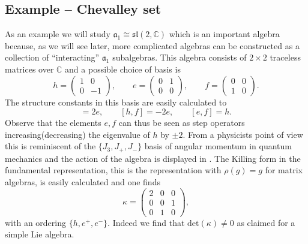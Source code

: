 \subsection{Example -- Chevalley set}
As an example we will study $\mathfrak{a}_1\cong\mathfrak{sl}(2,\mathbb{C})$ which is an important algebra because, as we will see later, more complicated algebras can be constructed as a collection of ``interacting'' $\mathfrak{a}_1$ subalgebras. This algebra consists of $2\times 2$ traceless matrices over $\mathbb{C}$ and a possible choice of basis is
\begin{equation}
    h=\begin{pmatrix}1&0\\0 &-1\end{pmatrix},\qquad e=\begin{pmatrix}0&1\\0 &0\end{pmatrix},\qquad f=\begin{pmatrix}0&0\\1 &0\end{pmatrix}.
\end{equation}
The structure constants in this basis are easily calculated to
\begin{equation}
    [h,e] = 2e,\qquad [h,f]=-2e, \qquad [e,f]=h.
\end{equation}
Observe that the elements $e,f$ can thus be seen as step operators increasing(decreasing) the eigenvalue of $h$ by $\pm 2$. From a physicists point of view this is reminiscent of the $\{J_3,J_+,J_-\}$ basis of angular momentum in quantum mechanics and the action of the algebra is displayed in . The Killing form in the fundamental representation, this is the representation with $\rho(g)=g$ for matrix algebras, is easily calculated and one finds 
\begin{equation}
    \kappa = \begin{pmatrix}2&0&0\\0&0&1\\0&1&0\end{pmatrix},
\end{equation}
with an ordering $\{h,e^+,e^-\}$. Indeed we find that $\text{det}(\kappa)\neq 0$ as claimed for a simple Lie algebra.

